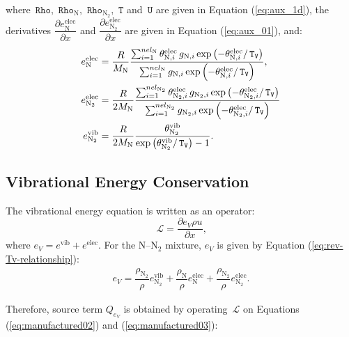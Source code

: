 \documentclass[10pt]{article}
\newcommand{\diff}[2] {\dfrac{\partial #1 }{\partial #2}}
\newcommand{\Lo}{\,\mathcal{L}}
\newcommand{\Rho}{\,\mathtt{Rho}}
\newcommand{\T}{\,\mathtt{T}}
\newcommand{\U}{\,\mathtt{U}}
\newcommand{\TV}{\,\mathtt{T_V}}
\newcommand{\N}{\text{N}}
\newcommand{\elec}{\text{elec}}
\newcommand{\vib}{\text{vib}}
\begin{document}
where $\Rho,\,\Rho_{\text{N}},\,\Rho_{\text{N}_2},\, \T$ and $\U$ are given  in Equation (\ref{eq:aux_1d}), the derivatives $\diff{e_{\N}^{\elec}}{x}$ and $\diff{e_{\N_2}^{\elec}}{x}$ are given in Equation (\ref{eq:aux_01}), and:
\begin{equation}
\begin{split}\label{eq:aux_02}
e_{\N}^{\elec} &=  \dfrac{R}{M_\N} \dfrac{\sum_{i=1}^{nel_{\N}}  \theta^{\elec}_{\N,i} \, g_{\N,i} \exp\left(- \theta^{\elec}_{\N,i}/ \TV \right)} { \sum_{i=1}^{nel_{\N}} g_{\N,i} \exp\left(-\theta^{\elec}_{\N,i}/\TV\right)},\vspace{5pt}	\\
%
e_{\N_2}^{\elec} &=\dfrac{R}{2 M_\N} \dfrac{\sum_{i=1}^{nel_{\N_2}}  \theta^{\elec}_{\N_2,i} \, g_{\N_2,i} \exp\left(- \theta^{\elec}_{\N_2,i} / \TV \right)} {\sum_{i=1}^{nel_{\N_2}} g_{\N_2,i} \exp\left(-\theta^{\elec}_{\N_2,i}/\TV\right)} \vspace{5pt}	\\
%
e_{\N_2}^{\vib} &= \dfrac{R}{2 M_\N} \frac{\theta^{\vib}_{\N_2}}{\exp\left(\theta^{\vib}_{\N_2}/ \TV \right) - 1} .
\end{split}
\end{equation}



\subsection{Vibrational Energy Conservation}
The vibrational energy equation is written as an operator:
\begin{equation*}
 \label{eq:euler1d_15}
\Lo =\diff{e_V \rho u }{x} ,
\end{equation*}
where $e_V= e^{\text{vib}} + e^{\elec} $. For the N--N$_2$ mixture, $e_V$ is given by Equation (\ref{eq:rev-Tv-relationship}):
\begin{equation*}
\begin{split}
e_V= \dfrac{\rho_{\N_2}}{\rho} e_{\N_2}^{\vib} + \dfrac{\rho_{\N}}{\rho} e_{\N}^{\elec} + \dfrac{\rho_{\N_2}}{\rho} e_{\N_2}^{\elec}.
\end{split}
\end{equation*}

Therefore, source term $Q_{e_V}$ is obtained by operating $\Lo$ on Equations (\ref{eq:manufactured02}) and (\ref{eq:manufactured03}):
%
\end{document}
